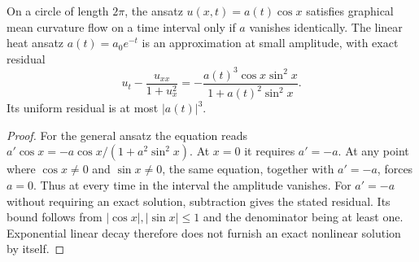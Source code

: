 \begin{example}\label{ex:graphical-single-mode-not-solution}
On a circle of length $2\pi$, the ansatz $u(x,t)=a(t)\cos x$ satisfies graphical mean curvature flow on a time interval only if $a$ vanishes identically. The linear heat ansatz $a(t)=a_0e^{-t}$ is an approximation at small amplitude, with exact residual
\[
 u_t-\frac{u_{xx}}{1+u_x^2}
   =-\frac{a(t)^3\cos x\sin^2x}{1+a(t)^2\sin^2x}.
\]
Its uniform residual is at most $|a(t)|^3$.
\end{example}
\begin{proof}
For the general ansatz the equation reads
$a'\cos x=-a\cos x/(1+a^2\sin^2x)$.
At $x=0$ it requires $a'=-a$. At any point where $\cos x\ne0$ and $\sin x\ne0$, the same equation, together with $a'=-a$, forces $a=0$. Thus at every time in the interval the amplitude vanishes. For $a'=-a$ without requiring an exact solution, subtraction gives the stated residual. Its bound follows from $|\cos x|,|\sin x|\leq1$ and the denominator being at least one. Exponential linear decay therefore does not furnish an exact nonlinear solution by itself.
\end{proof}
